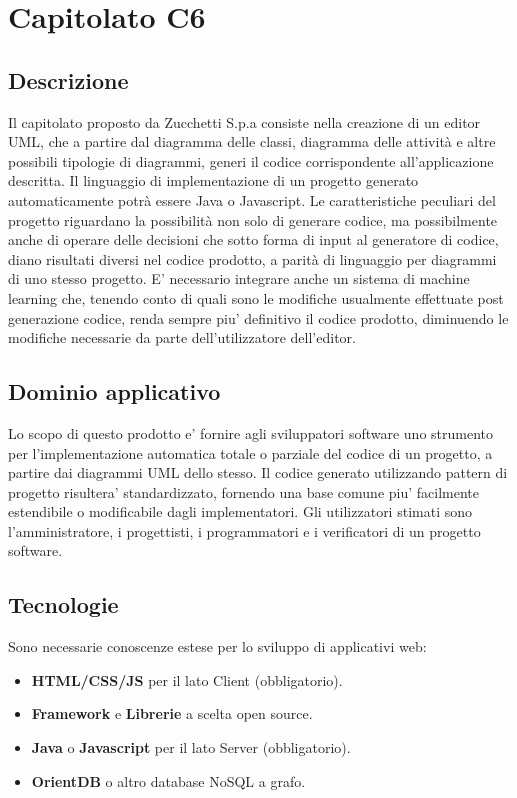 \newpage
\section{Capitolato C6}

\subsection{Descrizione}

Il capitolato proposto da Zucchetti S.p.a consiste nella creazione di un
editor UML, che a partire dal diagramma delle classi, diagramma delle attività e altre possibili tipologie di diagrammi, generi il codice corrispondente all'applicazione descritta. Il linguaggio di implementazione di un progetto generato automaticamente potrà essere Java o Javascript. Le caratteristiche peculiari del progetto riguardano la possibilità non solo di generare codice, ma possibilmente anche di operare delle decisioni che sotto forma di input al generatore di codice, diano risultati diversi nel codice prodotto,
a parità di linguaggio per diagrammi di uno stesso progetto. E' necessario
integrare anche un sistema di machine learning che, tenendo conto
di quali sono le modifiche usualmente effettuate post generazione
codice, renda sempre piu' definitivo il codice prodotto, diminuendo le modifiche necessarie da parte dell'utilizzatore dell'editor.

\subsection{Dominio applicativo}

Lo scopo di questo prodotto e' fornire agli sviluppatori software
uno strumento per l'implementazione automatica totale o parziale del
codice di un progetto, a partire dai diagrammi UML dello stesso. Il
codice generato utilizzando pattern di progetto risultera' standardizzato,
fornendo una base comune piu' facilmente estendibile o modificabile
dagli implementatori. Gli utilizzatori stimati sono l'amministratore,
i progettisti, i programmatori e i verificatori di un progetto software.

\subsection{Tecnologie}

Sono necessarie conoscenze estese per lo sviluppo di applicativi web:
\begin{itemize}
	\item \textbf{HTML/CSS/JS} per il lato Client
	(obbligatorio).
	\item \textbf{Framework }e \textbf{Librerie} a scelta open source.
	\item \textbf{Java }o\textbf{ Javascript} per il lato Server
	(obbligatorio).
	\item \textbf{OrientDB} o altro database NoSQL a grafo.
\end{itemize}


